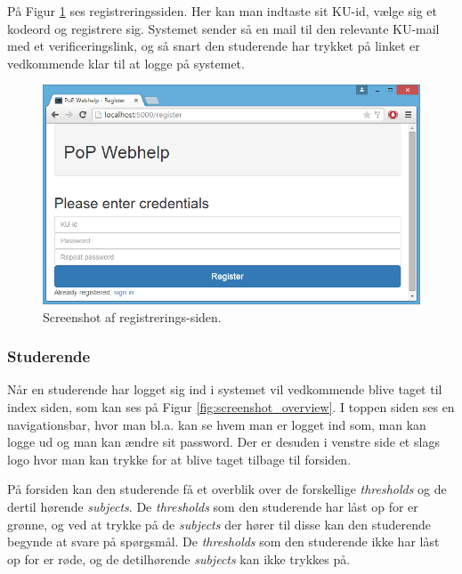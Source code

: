 \documentclass[11pt, a4paper]{article}
\begin{document}
På Figur \ref{fig:screenshot_register} ses registreringssiden. Her kan man indtaste sit KU-id, vælge sig et kodeord og registrere sig. Systemet sender så en mail til den relevante KU-mail med et verificeringslink, og så snart den studerende har trykket på linket er vedkommende klar til at logge på systemet.

\begin{figure}[htpb]
    \centering
    \includegraphics[width=1\linewidth]{figures/interface/register.png}
    \caption{Screenshot af registrerings-siden.}
    \label{fig:screenshot_register}
\end{figure}

\FloatBarrier

\subsubsection{Studerende}
\label{subsub:screenshots_student}
Når en studerende har logget sig ind i systemet vil vedkommende blive taget til index siden, som kan ses på Figur \ref{fig:screenshot_overview}.  I toppen siden ses en navigationsbar, hvor man bl.a. kan se hvem man er logget ind som, man kan logge ud og man kan ændre sit password. Der er desuden i venstre side et slags logo hvor man kan trykke for at blive taget tilbage til forsiden.

På forsiden kan den studerende få et overblik over de forskellige \emph{thresholds} og de dertil hørende \emph{subjects}. De \emph{thresholds} som den studerende har låst op for er grønne, og ved at trykke på de \emph{subjects} der hører til disse kan den studerende begynde at svare på spørgsmål. De \emph{thresholds} som den studerende ikke har låst op for er røde, og de detilhørende \emph{subjects} kan ikke trykkes på.
\end{document}

